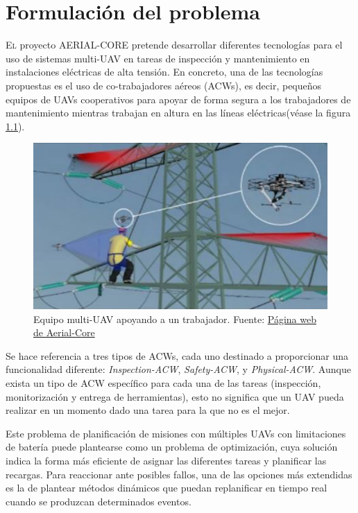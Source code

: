 \documentclass[fontsize=11pt, English=false, Español=true, Myfinal=true, twoside, numbers=noenddot]{scrbook}
\begin{document}
%
%
% 
%
%
%
\chapter{Formulación del problema}
\label{ch:ProblemFormulation}
\lettrine[lraise=-0.1, lines=2, loversize=0.2]{E}{l} proyecto AERIAL-CORE pretende desarrollar diferentes tecnologías para el uso de sistemas multi-\gls{UAV} en tareas de inspección y mantenimiento en instalaciones eléctricas de alta tensión. En concreto, una de las tecnologías propuestas es el uso de co-trabajadores aéreos (\glspl{ACW}), es decir, pequeños equipos de \glspl{UAV} cooperativos para apoyar de forma segura a los trabajadores de mantenimiento mientras trabajan en altura en las líneas eléctricas(véase la figura \ref{fig:aerial_co_worker}).

\begin{figure}[htbp]
    \centering
    \includegraphics[width=.75\linewidth]
    {ProblemFormulation/figures/aerial_co_worker.jpeg}
    \caption{Equipo multi-\gls{UAV} apoyando a un trabajador. Fuente: \href{https://aerial-core.eu/}{Página web de Aerial-Core}}
    \label{fig:aerial_co_worker}
\end{figure}

Se hace referencia a tres tipos de \glspl{ACW}, cada uno destinado a proporcionar una funcionalidad diferente: \textit{Inspection-ACW}, \textit{Safety-ACW}, y \textit{Physical-ACW}. Aunque exista un tipo de \gls{ACW} específico para cada una de las tareas (inspección, monitorización y entrega de herramientas), esto no significa que un \gls{UAV} pueda realizar en un momento dado una tarea para la que no es el mejor. 

Este problema de planificación de misiones con múltiples \glspl{UAV} con limitaciones de batería puede plantearse como un problema de optimización, cuya solución indica la forma más eficiente de asignar las diferentes tareas y planificar las recargas. Para reaccionar ante posibles fallos, una de las opciones más extendidas es la de plantear métodos dinámicos que puedan replanificar en tiempo real cuando se produzcan determinados eventos. 
\end{document}

